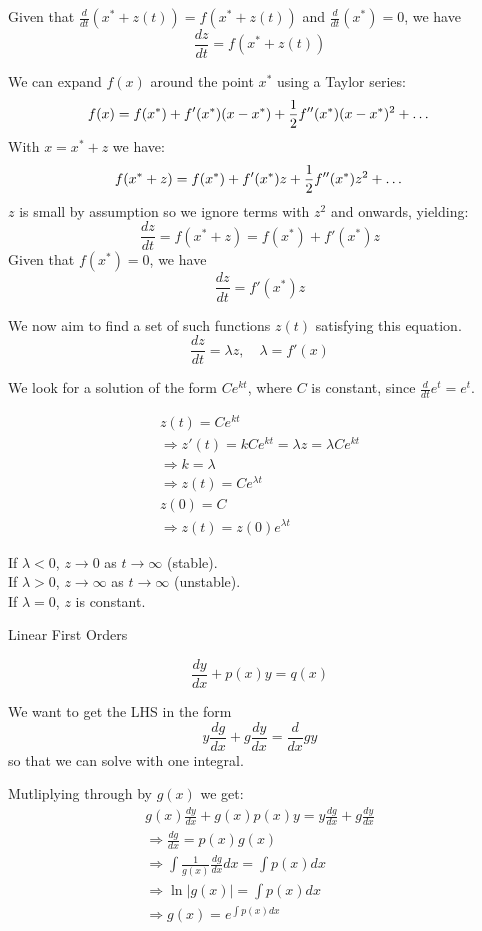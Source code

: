 \documentclass[a4paper,10pt]{article}
\begin{document}
Given that $\frac{d}{dt}(x^* + z(t)) = f(x^* + z(t))$ and
$\frac{d}{dt}(x^*) = 0$, we have
\[
	\frac{dz}{dt} = f(x^* + z(t))
\]

We can expand $f(x)$ around the point $x^*$ using a Taylor series:
\[
	f(x) = f(x^*) + f'(x^*)(x - x^*) + \frac{1}{2}f''(x^*)(x - x^*)^2 + \dots \\
\]
With $x = x^* + z$ we have:
\[
	f(x^* + z) = f(x^*) + f'(x^*)z + \frac{1}{2}f''(x^*)z^2 + \dots \\
\]
$z$ is small by assumption so we ignore terms with $z^2$ and onwards, yielding:
\[
	\frac{dz}{dt} = f(x^* + z) = f(x^*) + f'(x^*)z
\]
Given that $f(x^*) = 0$, we have
\[
	\frac{dz}{dt} = f'(x^*)z
\]

We now aim to find a set of such functions $z(t)$ satisfying this equation.
\[
	\frac{dz}{dt} = \lambda z, \quad \lambda = f'(x)
\]

We look for a solution of the form $Ce^{kt}$, where $C$ is constant,
since $\frac{d}{dt} e^t = e^t$.

\begin{gather*}
	z(t) = Ce^{kt} \\
	\Rightarrow z'(t) = kCe^{kt} = \lambda z = \lambda Ce^{kt} \\
	\Rightarrow k = \lambda \\
	\Rightarrow z(t) = Ce^{\lambda t} \\
	z(0) = C \\
	\Rightarrow z(t) = z(0)e^{\lambda t}
\end{gather*}

If $\lambda < 0$, $z \to 0$ as $t \to \infty$ (stable). \\
If $\lambda > 0$, $z \to \infty$ as $t \to \infty$ (unstable). \\
If $\lambda = 0$, $z$ is constant.

Linear First Orders

\[
	\frac{dy}{dx} + p(x)y = q(x)
\]

We want to get the LHS in the form
\[
	y\frac{dg}{dx} + g\frac{dy}{dx} = \frac{d}{dx} gy
\]
so that we can solve with one integral.

Mutliplying through by $g(x)$ we get:
\begin{gather*}
	g(x)\frac{dy}{dx} + g(x)p(x)y = y\frac{dg}{dx} + g\frac{dy}{dx} \\
	\Rightarrow \frac{dg}{dx} = p(x)g(x) \\
	\Rightarrow \int \frac{1}{g(x)} \frac{dg}{dx} dx = \int p(x) dx \\
	\Rightarrow \ln |g(x)| = \int p(x) dx \\
	\Rightarrow g(x) = e^{\int p(x) dx}
\end{gather*}
\end{document}

